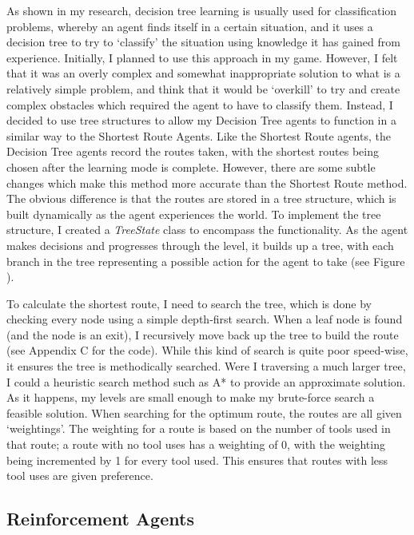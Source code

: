 \documentclass[a4paper,oneside]{report}
\begin{document}
As shown in my research, decision tree learning is usually used for classification problems, whereby an agent finds itself in a certain situation, and it uses a decision tree to try to `classify' the situation using knowledge it has gained from experience. Initially, I planned to use this approach in my game. However, I felt that it was an overly complex and somewhat inappropriate solution to what is a relatively simple problem, and think that it would be `overkill' to try and create complex obstacles which required the agent to have to classify them. Instead, I decided to use tree structures to allow my Decision Tree agents to function in a similar way to the Shortest Route Agents. Like the Shortest Route agents, the Decision Tree agents record the routes taken, with the shortest routes being chosen after the learning mode is complete. However, there are some subtle changes which make this method more accurate than the Shortest Route method. The obvious difference is that the routes are stored in a tree structure, which is built dynamically as the agent experiences the world. To implement the tree structure, I created a \emph{TreeState} class to encompass the functionality. As the agent makes decisions and progresses through the level, it builds up a tree, with each branch in the tree representing a possible action for the agent to take (see Figure ).

To calculate the shortest route, I need to search the tree, which is done by checking every node using a simple depth-first search. When a leaf node is found (and the node is an exit), I recursively move back up the tree to build the route (see Appendix C for the code). While this kind of search is quite poor speed-wise, it ensures the tree is methodically searched. Were I traversing a much larger tree, I could a heuristic search method such as A* to provide an approximate solution. As it happens, my levels are small enough to make my brute-force search a feasible solution. When searching for the optimum route, the routes are all given `weightings'. The weighting for a route is based on the number of tools used in that route; a route with no tool uses has a weighting of 0, with the weighting being incremented by 1 for every tool used. This ensures that routes with less tool uses are given preference.

\subsection{Reinforcement Agents}
\end{document}

